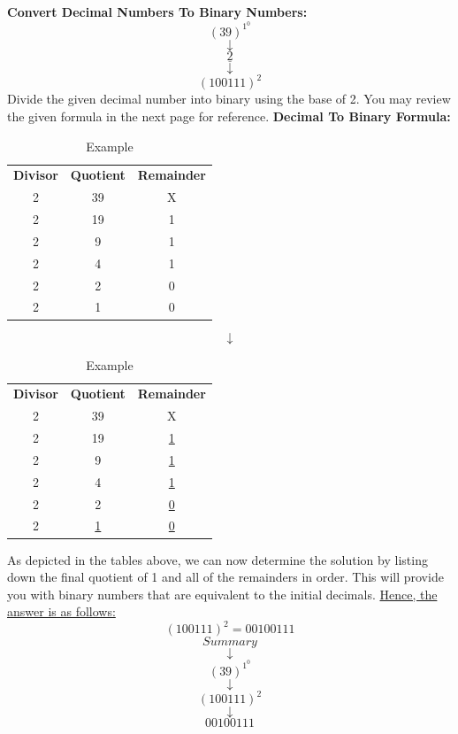 \documentclass{article}
\begin{document}
\textbf{Convert Decimal Numbers To Binary Numbers:}
$$(39)^1^0$$
$$\downarrow$$
$$\underline{2}$$
$$\downarrow$$
$$(100111)^2$$
\newline
Divide the given decimal number into binary using the base of 2. You may review the given formula in the next page for reference.
\newpage
\textbf{Decimal To Binary Formula:}
\newline
\begin{table}[h!]
    \centering
    \begin{tabular}{|c|c|c|}
        \textbf{Divisor} & \textbf{Quotient} & \textbf{Remainder} \\
        2 & 39 & X \\
        2 & 19 & 1 \\
        2 & 9 & 1 \\
        2 & 4 & 1 \\
        2 & 2 & 0 \\
        2 & 1 & 0 \\
        
    \end{tabular}
    \caption{Example}
    \label{tab:my_label}
\end{table}
$$\downarrow$$
\begin{table}[h!]
    \centering
    \begin{tabular}{|c|c|c|}
        \textbf{Divisor} & \textbf{Quotient} & \textbf{Remainder} \\
        2 & 39 & X \\
        2 & 19 & \underline{1} \\
        2 & 9 & \underline{1} \\
        2 & 4 & \underline{1} \\
        2 & 2 & \underline{0} \\
        2 & \underline{1} & \underline{0} \\
        
    \end{tabular}
    \caption{Example}
    \label{tab:my_label}
\end{table}
\newline
As depicted in the tables above, we can now determine the solution by listing down the final quotient of 1 and all of the remainders in order. This will provide you with binary numbers that are equivalent to the initial decimals. \underline{Hence, the answer is as follows:}
\newline
$$(100111)^2 = 0010 0111$$
\newline
$$Summary$$
$$\downarrow$$
$$(39)^1^0$$
$$\downarrow$$
$$(100111)^2$$
$$\downarrow$$
$$00100111$$
\end{document}
